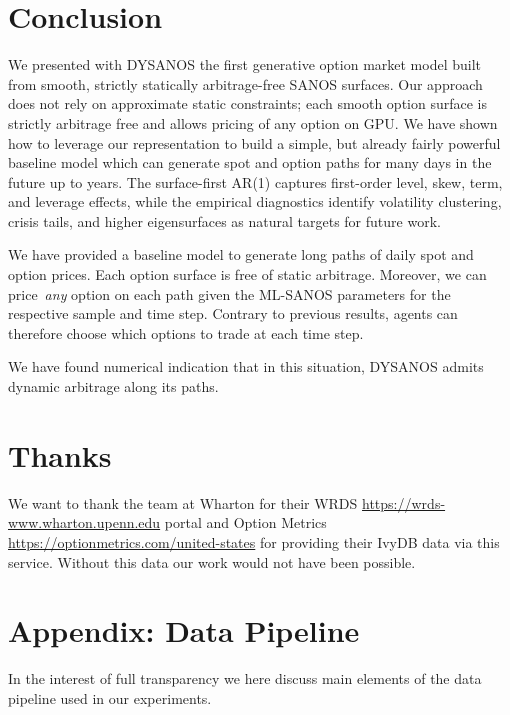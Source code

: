 \documentclass[11pt,a4paper]{article}
\begin{document}




\section{Conclusion}

We presented with DYSANOS the first generative option market model built from
smooth, strictly statically arbitrage-free SANOS surfaces. Our approach does not rely on
approximate static constraints; each smooth option surface is strictly arbitrage free and allows
pricing of any option on GPU. We have shown how
to leverage our representation to build a simple, but already fairly powerful baseline
model which can generate spot and option paths for many days in the future up to years.
The surface-first AR(1) captures first-order level, skew, term, and leverage
effects, while the empirical diagnostics identify volatility clustering,
crisis tails, and higher eigensurfaces as natural targets for future work.

We have provided a baseline model to generate long paths of daily spot and option prices.
Each option surface is free of static arbitrage. Moreover, we can price~\emph{any}
option on each path given the ML-SANOS parameters for the respective sample and
time step. Contrary to previous results, agents can therefore choose which
options to trade at each time step.

We have found 
numerical indication that in this situation, DYSANOS admits dynamic arbitrage along its paths.

\section{Thanks}

We want to thank the team at Wharton for their WRDS \url{https://wrds-www.wharton.upenn.edu} portal and Option Metrics \url{https://optionmetrics.com/united-states} 
for providing their IvyDB data via this service. Without this data our work would not have been possible.

\appendix
\section{Appendix: Data Pipeline}

In the interest of full transparency we here discuss main elements of the data pipeline used
in our experiments. \\
\end{document}
